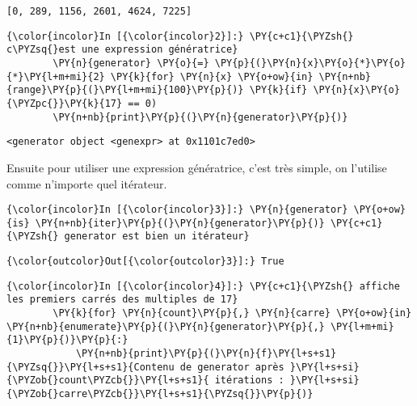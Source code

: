     \begin{Verbatim}[commandchars=\\\{\}]
[0, 289, 1156, 2601, 4624, 7225]

    \end{Verbatim}

    \begin{Verbatim}[commandchars=\\\{\}]
{\color{incolor}In [{\color{incolor}2}]:} \PY{c+c1}{\PYZsh{} c\PYZsq{}est une expression génératrice}
        \PY{n}{generator} \PY{o}{=} \PY{p}{(}\PY{n}{x}\PY{o}{*}\PY{o}{*}\PY{l+m+mi}{2} \PY{k}{for} \PY{n}{x} \PY{o+ow}{in} \PY{n+nb}{range}\PY{p}{(}\PY{l+m+mi}{100}\PY{p}{)} \PY{k}{if} \PY{n}{x}\PY{o}{\PYZpc{}}\PY{k}{17} == 0) 
        \PY{n+nb}{print}\PY{p}{(}\PY{n}{generator}\PY{p}{)}
\end{Verbatim}


    \begin{Verbatim}[commandchars=\\\{\}]
<generator object <genexpr> at 0x1101c7ed0>

    \end{Verbatim}

    Ensuite pour utiliser une expression génératrice, c'est très simple, on
l'utilise comme n'importe quel itérateur.

    \begin{Verbatim}[commandchars=\\\{\}]
{\color{incolor}In [{\color{incolor}3}]:} \PY{n}{generator} \PY{o+ow}{is} \PY{n+nb}{iter}\PY{p}{(}\PY{n}{generator}\PY{p}{)} \PY{c+c1}{\PYZsh{} generator est bien un itérateur}
\end{Verbatim}


\begin{Verbatim}[commandchars=\\\{\}]
{\color{outcolor}Out[{\color{outcolor}3}]:} True
\end{Verbatim}
            
    \begin{Verbatim}[commandchars=\\\{\}]
{\color{incolor}In [{\color{incolor}4}]:} \PY{c+c1}{\PYZsh{} affiche les premiers carrés des multiples de 17}
        \PY{k}{for} \PY{n}{count}\PY{p}{,} \PY{n}{carre} \PY{o+ow}{in} \PY{n+nb}{enumerate}\PY{p}{(}\PY{n}{generator}\PY{p}{,} \PY{l+m+mi}{1}\PY{p}{)}\PY{p}{:}
            \PY{n+nb}{print}\PY{p}{(}\PY{n}{f}\PY{l+s+s1}{\PYZsq{}}\PY{l+s+s1}{Contenu de generator après }\PY{l+s+si}{\PYZob{}count\PYZcb{}}\PY{l+s+s1}{ itérations : }\PY{l+s+si}{\PYZob{}carre\PYZcb{}}\PY{l+s+s1}{\PYZsq{}}\PY{p}{)}
\end{Verbatim}


